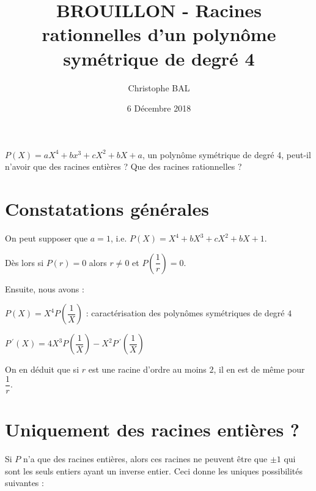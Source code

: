 \documentclass[12pt]{amsart}
\begin{document}
\title{BROUILLON - Racines rationnelles d'un polynôme symétrique de degré 4}
\author{Christophe BAL}
\date{6 Décembre 2018}
\maketitle

$P(X) = a X^4 + b x^3 + c X^2 + b X + a$, un polynôme symétrique de degré 4, peut-il n'avoir que des racines entières ? Que des racines rationnelles ?



\section{Constatations générales}

On peut supposer que $a = 1$, i.e. $P(X) = X^4 + b X^3 + c X^2 + b X + 1$.

Dès lors si $P(r) = 0$ alors $r \neq 0$ et $P\left( \dfrac1r \right) = 0$.

Ensuite, nous avons :

\medskip

$P(X) = X^4 P\left( \dfrac1X \right)$ : caractérisation des polynômes symétriques de degré $4$

\medskip

$P\,^{\prime}(X) = 4 X^3 P\left( \dfrac1X \right) 
            - X^2 P\,^{\prime}\left( \dfrac1X \right)$

%
%

On en déduit que si $r$ est une racine d'ordre au moins $2$, il en est de même pour $\dfrac1r$.


\section{Uniquement des racines entières ?}

Si $P$ n'a que des racines entières, alors ces racines ne peuvent être que $\pm 1$ qui sont les seuls entiers ayant un inverse entier. Ceci donne les uniques  possibilités suivantes :
\end{document}
